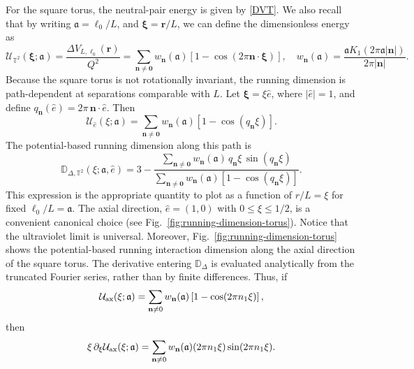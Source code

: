 \documentclass[nopacs,amsmath,amsfonts,amssymb,aps,superscriptaddress]{revtex4}
\begin{document}
For the square torus, the neutral-pair energy is given by \eqref{DVT}. We also recall that by writing $\mathfrak{a}=\ell_0/L$, and $\boldsymbol{\xi}=\mathbf r/L$, we can define the dimensionless energy as
\begin{equation}
  \mathcal U_{\mathbb T^2}(\boldsymbol{\xi};\mathfrak{a})=\frac{\Delta V_{L,\ell_0}(\mathbf r)}{Q^2}=\sum_{\mathbf n\neq\mathbf 0}w_{\mathbf n}(\mathfrak{a})\left[1-\cos(2\pi\mathbf n\cdot\boldsymbol{\xi})\right],\quad w_{\mathbf n}(\mathfrak{a})=\frac{\mathfrak{a}K_1(2\pi \mathfrak{a}|\mathbf n|)}{2\pi|\mathbf n|}.
\end{equation}
Because the square torus is not rotationally invariant, the running dimension is path-dependent at separations comparable with $L$. Let $\boldsymbol{\xi}=\xi\hat e$, where $|\hat e|=1$, and define $q_{\mathbf n}(\hat e)=2\pi\,\mathbf n\cdot\hat e$. Then
\begin{equation}
  \mathcal U_{\hat e}(\xi;\mathfrak{a})=\sum_{\mathbf n\neq\mathbf 0}w_{\mathbf n}(\mathfrak{a})\left[1-\cos(q_{\mathbf n}\xi)\right].
\end{equation}
The potential-based running dimension along this path is
\begin{equation}\label{DDelta}
  \mathbb D_{\Delta,\mathbb T^2}(\xi;\mathfrak{a},\hat e)=3-\frac{\displaystyle\sum_{\mathbf n\neq\mathbf 0} w_{\mathbf n}(\mathfrak{a})\,q_{\mathbf n}\xi\,\sin(q_{\mathbf n}\xi)}{\displaystyle\sum_{\mathbf n\neq\mathbf 0}w_{\mathbf n}(\mathfrak{a})\left[1-\cos(q_{\mathbf n}\xi)\right]}.
\end{equation}
This expression is the appropriate quantity to plot as a function of $r/L=\xi$ for fixed $\ell_0/L=\mathfrak{a}$. The axial direction, $\hat e=(1,0)$ with $0\leq \xi\leq 1/2$, is a convenient canonical choice (see Fig.~\ref{fig:running-dimension-torus}). Notice that the ultraviolet limit is universal. Moreover, Fig.~\ref{fig:running-dimension-torus} shows the potential-based running interaction dimension along the axial direction of the square torus. The derivative entering $\mathbb D_\Delta$ is evaluated analytically from the truncated Fourier series, rather than by finite differences. Thus, if
\begin{equation}
  \mathcal U_{\rm ax}(\xi;\mathfrak a)=\sum_{\mathbf n\neq0} w_{\mathbf n}(\mathfrak a)\left[1-\cos(2\pi n_1\xi)\right],
\end{equation}
then
\begin{equation}
  \xi\,\partial_\xi\mathcal U_{\rm ax}(\xi;\mathfrak a) = \sum_{\mathbf n\neq0}w_{\mathbf n}(\mathfrak a)(2\pi n_1\xi)\sin(2\pi n_1\xi).
\end{equation}
\end{document}
